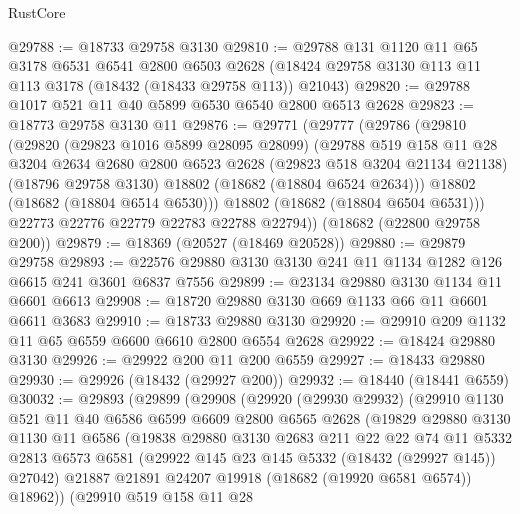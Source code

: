 \begin{lexlean}{RustCore}
\begin{coremodule}
@29788 := @18733 @29758 @3130
@29810 := @29788
    @131
    @1120
    @11
    @65
    @3178
    @6531
    @6541
    @2800
    @6503
    @2628
    (@18424 @29758 @3130 @113 @11 @113 @3178 (@18432 (@18433 @29758 @113)) @21043)
@29820 := @29788 @1017 @521 @11 @40 @5899 @6530 @6540 @2800 @6513 @2628
@29823 := @18773 @29758 @3130 @11
@29876 := @29771
    (@29777
      (@29786
        (@29810
          (@29820
            (@29823 @1016 @5899 @28095 @28099)
            (@29788
              @519
              @158
              @11
              @28
              @3204
              @2634
              @2680
              @2800
              @6523
              @2628
              (@29823 @518 @3204 @21134 @21138)
              (@18796 @29758 @3130)
              @18802
              (@18682 (@18804 @6524 @2634)))
            @18802
            (@18682 (@18804 @6514 @6530)))
          @18802
          (@18682 (@18804 @6504 @6531)))
        @22773
        @22776
        @22779
        @22783
        @22788
        @22794))
    (@18682 (@22800 @29758 @200))
@29879 := @18369 (@20527 (@18469 @20528))
@29880 := @29879 @29758
@29893 := @22576 @29880 @3130 @3130 @241 @11 @1134 @1282 @126 @6615 @241 @3601 @6837 @7556
@29899 := @23134 @29880 @3130 @1134 @11 @6601 @6613
@29908 := @18720 @29880 @3130 @669 @1133 @66 @11 @6601 @6611 @3683
@29910 := @18733 @29880 @3130
@29920 := @29910 @209 @1132 @11 @65 @6559 @6600 @6610 @2800 @6554 @2628
@29922 := @18424 @29880 @3130
@29926 := @29922 @200 @11 @200 @6559
@29927 := @18433 @29880
@29930 := @29926 (@18432 (@29927 @200))
@29932 := @18440 (@18441 @6559)
@30032 := @29893
    (@29899
      (@29908
        (@29920
          (@29930 @29932)
          (@29910
            @1130
            @521
            @11
            @40
            @6586
            @6599
            @6609
            @2800
            @6565
            @2628
            (@19829
              @29880
              @3130
              @1130
              @11
              @6586
              (@19838
                @29880
                @3130
                @2683
                @211
                @22
                @22
                @74
                @11
                @5332
                @2813
                @6573
                @6581
                (@29922 @145 @23 @145 @5332 (@18432 (@29927 @145)) @27042)
                @21887
                @21891
                @24207
                @19918
                (@18682 (@19920 @6581 @6574))
                @18962))
            (@29910
              @519
              @158
              @11
              @28

\end{coremodule}
\end{lexlean}
